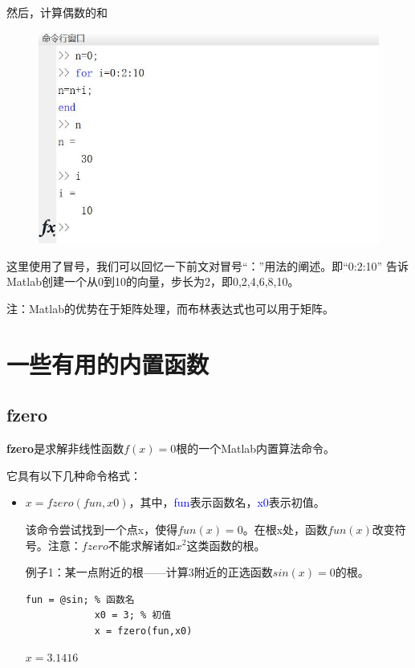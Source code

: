 \documentclass[10pt,math=newtx,citestyle=gb7714-2015,bibstyle=gb7714-2015]{elegantbook}
\begin{document}
{{{	然后，计算偶数的和
	
	\begin{figure}[htbp!]
		\centering
		\includegraphics[width=0.8\linewidth]{FIG/vectorevensum}
		\centering
	\end{figure}
	
	这里使用了冒号，我们可以回忆一下前文对冒号“：”用法的阐述。即“0:2:10” 告诉Matlab创建一个从0到10的向量，步长为2，即0,2,4,6,8,10。
	
	注：Matlab的优势在于矩阵处理，而布林表达式也可以用于矩阵。
	
	\section{一些有用的内置函数}
	
	\subsection{fzero}
	
	\textbf{fzero}是求解非线性函数$f(x)=0$根的一个Matlab内置算法命令。
	
	它具有以下几种命令格式：
	\begin{itemize}
		\item $x=fzero(fun,x0)$，其中，\textcolor{blue}{fun}表示函数名，\textcolor{blue}{x0}表示初值。
		
		该命令尝试找到一个点x，使得$fun(x)=0$。在根x处，函数$fun(x)$改变符号。注意：$fzero$不能求解诸如$x^2$这类函数的根。
		
		例子1：某一点附近的根——计算3附近的正选函数$sin(x)=0$的根。
		
		\begin{lstlisting}[frame=shadowbox]
			fun = @sin; % 函数名
			x0 = 3; % 初值
			x = fzero(fun,x0)
		\end{lstlisting}
		
		$x=3.1416$
		

\end{itemize}}}}
\end{document}
